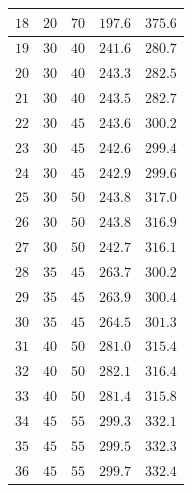 \documentclass[a4paper]{ltxdoc}
\begin{document}
\begin{multicols}{2}
\begin{tabular}{|c|c|c|c|c|}
        \hline $18$       & $20$           & $70$           & $197.6$         & $375.6$        \\
        \hline
        \hline $19$       & $30$           & $40$           & $241.6$         & $280.7$        \\
        \hline $20$       & $30$           & $40$           & $243.3$         & $282.5$        \\
        \hline $21$       & $30$           & $40$           & $243.5$         & $282.7$        \\
        \hline
        \hline $22$       & $30$           & $45$           & $243.6$         & $300.2$        \\
        \hline $23$       & $30$           & $45$           & $242.6$         & $299.4$        \\
        \hline $24$       & $30$           & $45$           & $242.9$         & $299.6$        \\
        \hline
        \hline $25$       & $30$           & $50$           & $243.8$         & $317.0$        \\
        \hline $26$       & $30$           & $50$           & $243.8$         & $316.9$        \\
        \hline $27$       & $30$           & $50$           & $242.7$         & $316.1$        \\
        \hline
        \hline $28$       & $35$           & $45$           & $263.7$         & $300.2$        \\
        \hline $29$       & $35$           & $45$           & $263.9$         & $300.4$        \\
        \hline $30$       & $35$           & $45$           & $264.5$         & $301.3$        \\
        \hline
        \hline $31$       & $40$           & $50$           & $281.0$         & $315.4$        \\
        \hline $32$       & $40$           & $50$           & $282.1$         & $316.4$        \\
        \hline $33$       & $40$           & $50$           & $281.4$         & $315.8$        \\
        \hline
        \hline $34$       & $45$           & $55$           & $299.3$         & $332.1$        \\
        \hline $35$       & $45$           & $55$           & $299.5$         & $332.3$        \\
        \hline $36$       & $45$           & $55$           & $299.7$         & $332.4$        \\
        \hline
    \end{tabular}
\end{multicols}
\end{document}
